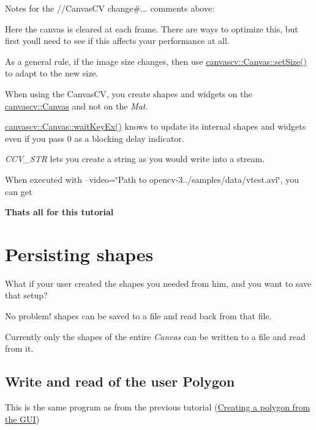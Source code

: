  Notes for the {\ttfamily //\+Canvas\+CV change\#...} comments above\+:
\begin{DoxyItemize}
\item Here the canvas is cleared at each frame. There are ways to optimize this, but first you\textquotesingle{}ll need to see if this affects your performance at all.
\item As a general rule, if the image size changes, then use \hyperlink{classcanvascv_1_1Canvas_ab9ffc28f7a21e1375da18cc4f03343ae}{canvascv\+::\+Canvas\+::set\+Size()} to adapt to the new size.
\item When using the Canvas\+CV, you create shapes and widgets on the \hyperlink{classcanvascv_1_1Canvas}{canvascv\+::\+Canvas} and not on the {\itshape Mat}.
\item \hyperlink{classcanvascv_1_1Canvas_a59397db05f5d9e45264f626f6a2ae528}{canvascv\+::\+Canvas\+::wait\+Key\+Ex()} knows to update it\textquotesingle{}s internal shapes and widgets even if you pass 0 as a blocking delay indicator.
\item {\itshape C\+C\+V\+\_\+\+S\+TR} lets you create a string as you would write into a stream.
\item When executed with --video=\char`\"{}\+Path to opencv-\/3../samples/data/vtest.\+avi\char`\"{}, you can get  ~\newline

\end{DoxyItemize}

{\bfseries That\textquotesingle{}s all for this tutorial} \hypertarget{tutpersistency}{}\section{Persisting shapes}\label{tutpersistency}
What if your user created the shapes you needed from him, and you want to save that setup?

No problem! shapes can be saved to a file and read back from that file.

Currently only the shapes of the entire {\itshape Canvas} can be written to a file and read from it.\hypertarget{tutpersistency_persistency_s1}{}\subsection{Write and read of the user Polygon}\label{tutpersistency_persistency_s1}
This is the same program as from the previous tutorial (\hyperlink{tutshapes_shapes_s1}{Creating a polygon from the G\+UI})

